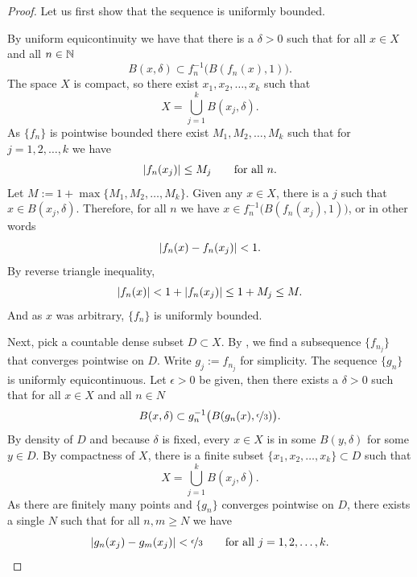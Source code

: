 \begin{proof}
Let us first show that the sequence is uniformly bounded.

By uniform equicontinuity we have that
there is a $\delta > 0$
such that
for all $x \in X$ and all $n \in {\mathbb{N}}$
\begin{equation*}
B(x,\delta) \subset f_n^{-1}\bigl(B(f_n(x),1)\bigr) .
\end{equation*}
The space $X$ is compact, so there exist $x_1,x_2,\ldots,x_k$
such that
\begin{equation*}
X = \bigcup_{j=1}^k B(x_j,\delta) .
\end{equation*}
As $\{ f_n \}$ is pointwise bounded there exist $M_1,M_2,\ldots,M_k$
such that for $j=1,2,\ldots,k$ we have
\begin{equation*}
\lvert {f_n(x_j)} \rvert \leq M_j \qquad \text{for all } n.
\end{equation*}
Let $M := 1+ \max \{ M_1,M_2,\ldots,M_k \}$.  Given any
$x \in X$, there is a $j$ such that $x \in B(x_j,\delta)$.  Therefore,
for all $n$ we have
$x \in f_n^{-1}\bigl(B(f_n(x_j),1)\bigr)$, or in other words
\begin{equation*}
\lvert {f_n(x)-f_n(x_j)} \rvert < 1 .
\end{equation*}
By reverse triangle inequality,
\begin{equation*}
\lvert {f_n(x)} \rvert < 1+ \lvert {f_n(x_j)} \rvert \leq 1+M_j \leq M .
\end{equation*}
And as $x$ was arbitrary, $\{f_n\}$ is uniformly bounded.


Next, pick a countable dense subset $D \subset X$.
By , we find
a subsequence $\{ f_{n_j} \}$ that converges pointwise on $D$.
Write $g_j := f_{n_j}$ for simplicity.
The sequence $\{ g_n \}$ is 
uniformly equicontinuous.
Let $\epsilon > 0$ be given, then there exists a $\delta > 0$
such that for all $x \in X$ and all $n \in N$
\begin{equation*}
B(x,\delta) \subset g_n^{-1}\bigl(B(g_n(x),\nicefrac{\epsilon}{3})\bigr).
\end{equation*}
By density of $D$ and because $\delta$ is fixed, every $x \in X$ is in some $B(y,\delta)$
for some $y \in D$.  By compactness of $X$,
there is a finite subset $\{ x_1,x_2,\ldots,x_k \} \subset D$
such that
\begin{equation*}
X = \bigcup_{j=1}^k B(x_j,\delta) .
\end{equation*}
As there are finitely many points and $\{ g_n \}$
converges pointwise on $D$, there exists a single $N$ such that for 
all $n,m \geq N$ we have
\begin{equation*}
\lvert {g_n(x_j)-g_m(x_j)} \rvert < \nicefrac{\epsilon}{3}
 \qquad \text{for all } j=1,2,\ldots,k.
\end{equation*}


\end{proof}
